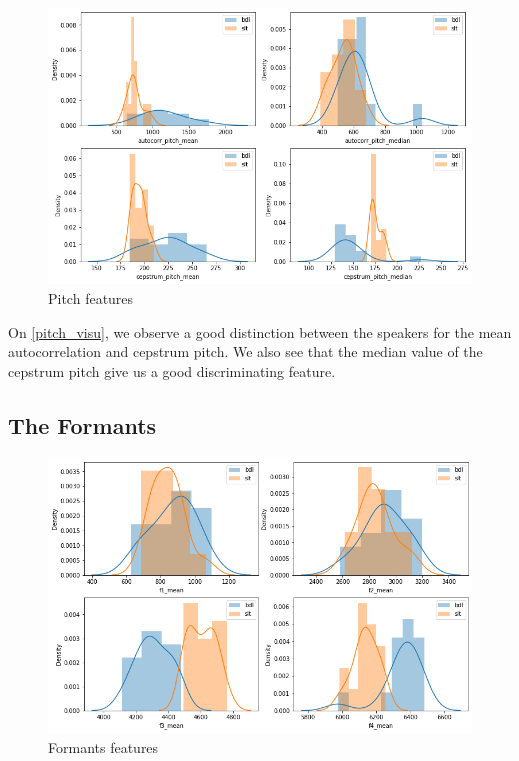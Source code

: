 \documentclass[]{article}
\begin{document}
\begin{figure}[H]
    \centering
    \caption{Pitch features}
    \label{pitch_visu}
    \includegraphics[scale=0.5]{images/pitch_visu.png} 
\end{figure}


On \autoref{pitch_visu}, we observe a good distinction between the speakers for the mean autocorrelation
and cepstrum pitch. We also see that the median value of the cepstrum pitch give us a good
discriminating feature.

\subsection{The Formants}


\begin{figure}[H]
    \centering
    \caption{\label{formants_visu}Formants features}
    \includegraphics[scale=0.5]{images/formants_visu.png}
\end{figure}
\end{document}
